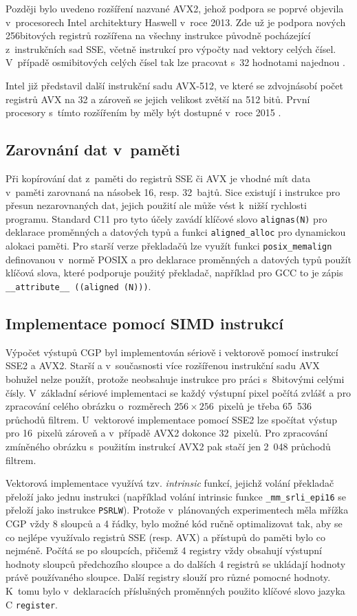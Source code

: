 Později bylo uvedeno rozšíření nazvané AVX2, jehož podpora se poprvé objevila v~procesorech Intel architektury Haswell v~roce 2013. Zde už je podpora nových 256bitových registrů rozšířena na všechny instrukce původně pocházející z~instrukčních sad SSE, včetně instrukcí pro výpočty nad vektory celých čísel. V~případě osmibitových celých čísel tak lze pracovat s~32 hodnotami najednou \cite{IntelAVXReference}.

Intel již představil další instrukční sadu AVX-512, ve které se zdvojnásobí počet registrů AVX na 32 a zároveň se jejich velikost zvětší na 512 bitů. První procesory s~tímto rozšířením by měly být dostupné v~roce 2015 \cite{IntelAvx512}.

\subsection{Zarovnání dat v~paměti}

Při kopírování dat z~paměti do registrů SSE či AVX je vhodné mít data v~paměti zarovnaná na násobek 16, resp. 32~bajtů. Sice existují i instrukce pro přesun nezarovnaných dat, jejich použití ale může vést k~nižší rychlosti programu. Standard C11 pro tyto účely zavádí klíčové slovo \texttt{alignas(N)} pro deklarace proměnných a datových typů a funkci \texttt{aligned\_alloc} pro dynamickou alokaci paměti. Pro starší verze překladačů lze využít funkci \texttt{posix\_memalign} definovanou v~normě POSIX a pro deklarace proměnných a datových typů použít klíčová slova, které podporuje použitý překladač, například pro GCC to je zápis \texttt{\_\_attribute\_\_~((aligned~(N)))}.

\subsection{Implementace pomocí SIMD instrukcí}

Výpočet výstupů CGP byl implementován sériově i vektorově pomocí instrukcí SSE2 a AVX2. Starší a v~současnosti více rozšířenou instrukční sadu AVX bohužel nelze použít, protože neobsahuje instrukce pro práci s~8bitovými celými čísly. V~základní sériové implementaci se každý výstupní pixel počítá zvlášť a pro zpracování celého obrázku o~rozměrech $256\times256$~pixelů je třeba 65~536 průchodů filtrem. U~vektorové implementace pomocí SSE2 lze spočítat výstup pro 16~pixelů zároveň a v~případě AVX2 dokonce 32~pixelů. Pro zpracování zmíněného obrázku s~použitím instrukcí AVX2 pak stačí jen 2~048 průchodů filtrem.

Vektorová implementace využívá tzv. \emph{intrinsic} funkcí, jejichž volání překladač přeloží jako jednu instrukci (například volání intrinsic funkce \texttt{\_mm\_srli\_epi16} se přeloží jako instrukce \texttt{PSRLW}). Protože v~plánovaných experimentech měla mřížka CGP vždy 8 sloupců a 4 řádky, bylo možné kód ručně optimalizovat tak, aby se co nejlépe využívalo registrů SSE (resp. AVX) a přístupů do paměti bylo co nejméně. Počítá se po sloupcích, přičemž 4 registry vždy obsahují výstupní hodnoty sloupců předchozího sloupce a do dalších 4 registrů se ukládají hodnoty právě používaného sloupce. Další registry slouží pro různé pomocné hodnoty. K~tomu bylo v~deklaracích příslušných proměnných použito klíčové slovo jazyka C \texttt{register}.

